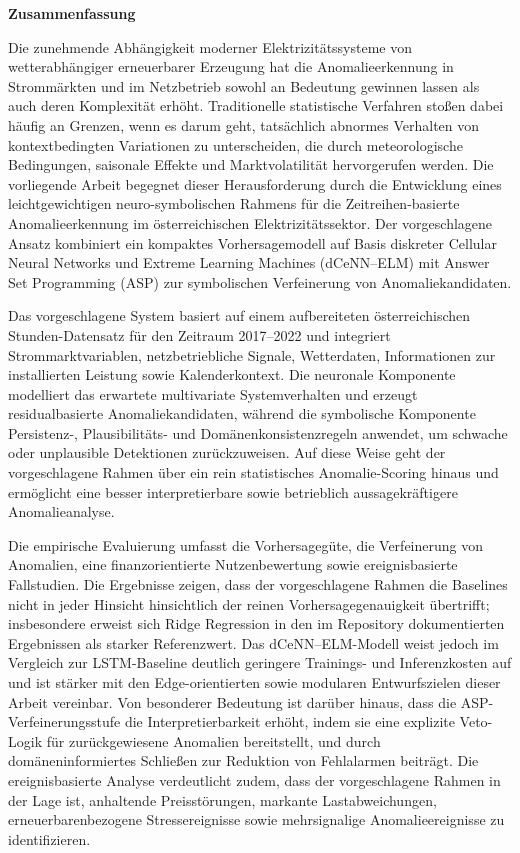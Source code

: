 {\Large
	\noindent
	{\bf Zusammenfassung}} \\
\vspace*{0.3 cm}

\noindent
Die zunehmende Abhängigkeit moderner Elektrizitätssysteme von wetterabhängiger erneuerbarer Erzeugung hat die Anomalieerkennung in Strommärkten und im Netzbetrieb sowohl an Bedeutung gewinnen lassen als auch deren Komplexität erhöht. Traditionelle statistische Verfahren stoßen dabei häufig an Grenzen, wenn es darum geht, tatsächlich abnormes Verhalten von kontextbedingten Variationen zu unterscheiden, die durch meteorologische Bedingungen, saisonale Effekte und Marktvolatilität hervorgerufen werden. Die vorliegende Arbeit begegnet dieser Herausforderung durch die Entwicklung eines leichtgewichtigen neuro-symbolischen Rahmens für die Zeitreihen-basierte Anomalieerkennung im österreichischen Elektrizitätssektor. Der vorgeschlagene Ansatz kombiniert ein kompaktes Vorhersagemodell auf Basis diskreter Cellular Neural Networks und Extreme Learning Machines (dCeNN--ELM) mit Answer Set Programming (ASP) zur symbolischen Verfeinerung von Anomaliekandidaten.

Das vorgeschlagene System basiert auf einem aufbereiteten österreichischen Stunden-Datensatz für den Zeitraum 2017--2022 und integriert Strommarktvariablen, netzbetriebliche Signale, Wetterdaten, Informationen zur installierten Leistung sowie Kalenderkontext. Die neuronale Komponente modelliert das erwartete multivariate Systemverhalten und erzeugt residualbasierte Anomaliekandidaten, während die symbolische Komponente Persistenz-, Plausibilitäts- und Domänenkonsistenzregeln anwendet, um schwache oder unplausible Detektionen zurückzuweisen. Auf diese Weise geht der vorgeschlagene Rahmen über ein rein statistisches Anomalie-Scoring hinaus und ermöglicht eine besser interpretierbare sowie betrieblich aussagekräftigere Anomalieanalyse.

Die empirische Evaluierung umfasst die Vorhersagegüte, die Verfeinerung von Anomalien, eine finanzorientierte Nutzenbewertung sowie ereignisbasierte Fallstudien. Die Ergebnisse zeigen, dass der vorgeschlagene Rahmen die Baselines nicht in jeder Hinsicht hinsichtlich der reinen Vorhersagegenauigkeit übertrifft; insbesondere erweist sich Ridge Regression in den im Repository dokumentierten Ergebnissen als starker Referenzwert. Das dCeNN--ELM-Modell weist jedoch im Vergleich zur LSTM-Baseline deutlich geringere Trainings- und Inferenzkosten auf und ist stärker mit den Edge-orientierten sowie modularen Entwurfszielen dieser Arbeit vereinbar. Von besonderer Bedeutung ist darüber hinaus, dass die ASP-Verfeinerungsstufe die Interpretierbarkeit erhöht, indem sie eine explizite Veto-Logik für zurückgewiesene Anomalien bereitstellt, und durch domäneninformiertes Schließen zur Reduktion von Fehlalarmen beiträgt. Die ereignisbasierte Analyse verdeutlicht zudem, dass der vorgeschlagene Rahmen in der Lage ist, anhaltende Preisstörungen, markante Lastabweichungen, erneuerbarenbezogene Stressereignisse sowie mehrsignalige Anomalieereignisse zu identifizieren.

